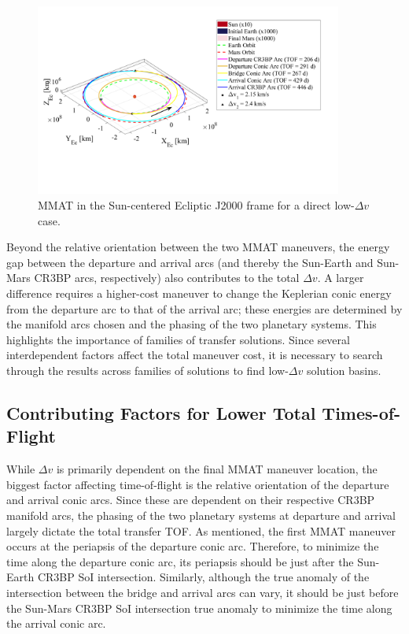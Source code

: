 \begin{figure}[!htb]
    \centering
    \includegraphics[width=0.9\textwidth]{figures/DirectMinDvMMAT.pdf}
    \caption{MMAT in the Sun-centered Ecliptic J2000 frame for a direct low-$\Delta v$ case.}
    \label{fig:directMinDvMMAT}
\end{figure}

Beyond the relative orientation between the two MMAT maneuvers, the energy gap between the
departure and arrival arcs (and thereby the Sun-Earth and Sun-Mars CR3BP arcs, respectively) also
contributes to the total $\Delta v$. A larger difference requires a higher-cost maneuver to change
the Keplerian conic energy from the departure arc to that of the arrival arc; these energies are
determined by the manifold arcs chosen and the phasing of the two planetary systems. This
highlights the importance of families of transfer solutions. Since several interdependent factors
affect the total maneuver cost, it is necessary to search through the results across families of
solutions to find low-$\Delta v$ solution basins.

\subsection{Contributing Factors for Lower Total Times-of-Flight}
While $\Delta v$ is primarily dependent on the final MMAT maneuver location, the biggest factor
affecting time-of-flight is the relative orientation of the departure and arrival conic arcs. Since
these are dependent on their respective CR3BP manifold arcs, the phasing of the two planetary
systems at departure and arrival largely dictate the total transfer TOF. As mentioned, the first
MMAT maneuver occurs at the periapsis of the departure conic arc. Therefore, to minimize the time
along the departure conic arc, its periapsis should be just after the Sun-Earth CR3BP SoI
intersection. Similarly, although the true anomaly of the intersection between the bridge and
arrival arcs can vary, it should be just before the Sun-Mars CR3BP SoI intersection true anomaly to
minimize the time along the arrival conic arc.

